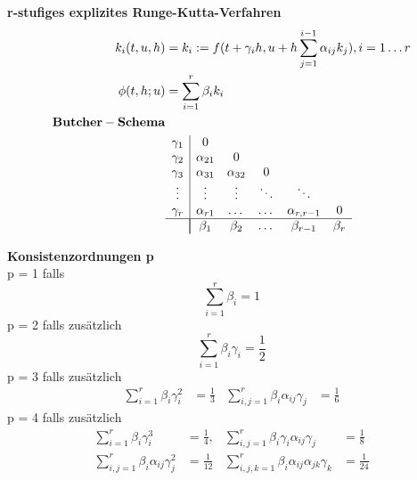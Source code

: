 \documentclass[
	ngerman,
	accentcolor=9c,%
	type=intern,
	marginpar=false
	]{tudapub}
\begin{document}
            \textbf{r-stufiges explizites Runge-Kutta-Verfahren}
            \begin{align*}
                k_i (t,u,h) &= k_i := f(t+\gamma_i h, u+h \sum_{j=1}^{i-1}\alpha_{ij}k_j), i = 1 \dots r\\
                \phi(t,h;u) &= \sum_{i=1}^r \beta_i k_i\\
                \mathbf{Butcher-Schema} & \\
                &
                \begin{array} {c | c c c c c}
                    \gamma_1 &  0\\
                    \gamma_2 &  \alpha_{21} & 0 \\
                    \gamma_3 &  \alpha_{31} & \alpha_{32} &  0\\
                    \vdots   &  \vdots & \vdots & \ddots &\ddots\\
                    \gamma_r &  \alpha_{r1} & \dots & \dots & \alpha_{r,r-1} & 0\\
                    \hline\\[-\normalbaselineskip]
                    & \beta_1 & \beta_2 & \dots & \beta_{r-1} & \beta_{r}
                \end{array}
            \end{align*}
            \newpage
            \setcounter{satz}{6}
            \begin{satz}
                \textbf{Konsistenzordnungen p} \\
                p = 1 falls
                \begin{equation*}
                    \sum_{i=1}^r \beta_i = 1
                \end{equation*}
                p = 2 falls zusätzlich
                \begin{equation*}
                    \sum_{i=1}^r \beta_i \gamma_i = \frac{1}{2}
                \end{equation*}
                p = 3 falls zusätzlich
                \begin{align*}
                    \sum_{i=1}^r \beta_i \gamma_i^2 &= \frac{1}{3} & \sum_{i,j=1}^r \beta_i \alpha_{ij} \gamma_j &= \frac{1}{6}
                \end{align*}
                p = 4 falls zusätzlich
                \begin{align*}
                    \sum_{i=1}^r \beta_i \gamma_i^3 &= \frac{1}{4}, & \sum_{i,j=1}^r \beta_i \gamma_i \alpha_{ij} \gamma_j &= \frac{1}{8}\\
                    \sum_{i,j=1}^r \beta_i \alpha_{ij} \gamma_j^2 &= \frac{1}{12} & \sum_{i,j,k=1}^r \beta_i \alpha_{ij} \alpha_{jk} \gamma_k &= \frac{1}{24}
                \end{align*}
            \end{satz}
\end{document}
